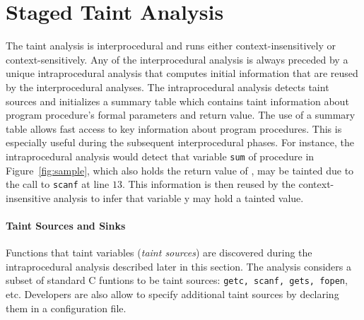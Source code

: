 \section{Staged Taint Analysis}\label{sec:analysis}

\newcommand{\varset}{\mathit{Var}}
\newcommand{\instset}{\mathit{Inst}}
\newcommand{\procset}{\mathit{Proc}}
\newcommand{\formalsset}{\mathit{formals}}
\newcommand{\firstfunc}{\mathit{first}}
\newcommand{\toplevelfunc}{\mathit{toplevel}}
\newcommand{\taintfunc}{\mathit{taint}}
\newcommand{\pointsto}[2]{{pt}_{[#1]}(#2)}
\newcommand{\pointstobefore}[2]{{pt}_{[\overline{#1}]	}(#2)}
\newcommand{\pointstoafter}[2]{{pt}_{[\underline{#1}]}(#2)}

\newcommand{\myinflow}{\mathit{IN}}
\newcommand{\myoutflow}{\mathit{OUT}}
\newcommand{\ifff}{\mathit{iff}}
\newcommand{\aand}{\mathit{and}}
\newcommand{\mybigcup}[2]{\mathlarger{\bigcup_{#1}^{#2}}}

The taint analysis is interprocedural and runs
either context-insensitively or context-sensitively.
Any of the interprocedural analysis is always preceded
by a unique intraprocedural analysis that computes initial
information that are reused by the interprocedural analyses.
The intraprocedural analysis detects taint sources and
initializes a summary table which contains taint information
about program procedure's formal parameters and return value.
The use of a summary table allows fast access to key
information about program procedures. This is especially
useful during the subsequent interprocedural phases.
For instance, the intraprocedural analysis would
detect that variable \texttt{sum} of procedure \compute{} in
Figure~\ref{fig:sample}, which also holds the return
value of \compute{}, may be tainted due to the call
to \texttt{scanf} at line $13$. This information is then
reused by the context-insensitive analysis to infer that
variable y may hold a tainted value.

\paragraph{Taint Sources and Sinks}
Functions that taint variables (\textit{taint sources}) are discovered
during the intraprocedural analysis described later in this section.
The analysis considers a subset of standard C funtions to be taint sources:
{\tt getc, scanf, gets, fopen}, etc.
Developers are also allow to specify additional taint sources
by declaring them in a configuration file.

